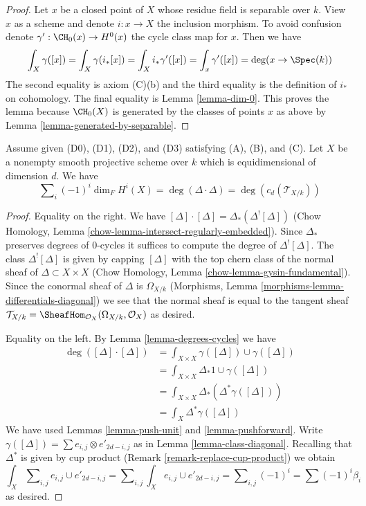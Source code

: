 \begin{proof}
Let $x$ be a closed point of $X$ whose residue field is separable
over $k$. View $x$ as a scheme and denote $i : x \to X$ the inclusion morphism.
To avoid confusion denote $\gamma' : \CH_0(x) \to H^0(x)$ the cycle class map
for $x$. Then we have
$$
\int_X \gamma([x]) = \int_X \gamma(i_*[x]) =
\int_X i_*\gamma'([x]) = \int_x \gamma'([x]) = \deg(x \to \Spec(k))
$$
The second equality is axiom (C)(b) and the third equality is
the definition of $i_*$ on cohomology. The final equality is
Lemma \ref{lemma-dim-0}. This proves the lemma
because $\CH_0(X)$ is generated by the classes of points $x$ as above
by Lemma \ref{lemma-generated-by-separable}.
\end{proof}

\begin{lemma}
\label{lemma-square-diagonal}
Assume given (D0), (D1), (D2), and (D3) satisfying (A), (B), and (C).
Let $X$ be a nonempty smooth projective scheme over $k$ which is
equidimensional of dimension $d$. We have
$$
\sum\nolimits_i (-1)^i\dim_F H^i(X) =
\deg(\Delta \cdot \Delta) = \deg(c_d(\mathcal{T}_{X/k}))
$$
\end{lemma}

\begin{proof}
Equality on the right. We have
$[\Delta] \cdot [\Delta] = \Delta_*(\Delta^![\Delta])$
(Chow Homology, Lemma \ref{chow-lemma-intersect-regularly-embedded}).
Since $\Delta_*$ preserves degrees of $0$-cycles it suffices to compute
the degree of $\Delta^![\Delta]$. The class $\Delta^![\Delta]$ is given
by capping $[\Delta]$ with
the top chern class of the normal sheaf of $\Delta \subset X \times X$
(Chow Homology, Lemma \ref{chow-lemma-gysin-fundamental}).
Since the conormal sheaf of $\Delta$ is $\Omega_{X/k}$
(Morphisms, Lemma \ref{morphisms-lemma-differentials-diagonal})
we see that the normal sheaf is equal to the tangent sheaf
$\mathcal{T}_{X/k} = \SheafHom_{\mathcal{O}_X}(\Omega_{X/k}, \mathcal{O}_X)$
as desired.

\medskip\noindent
Equality on the left. By Lemma \ref{lemma-degrees-cycles} we have
\begin{align*}
\deg([\Delta] \cdot [\Delta])
& =
\int_{X \times X} \gamma([\Delta]) \cup \gamma([\Delta]) \\
& =
\int_{X \times X} \Delta_*1 \cup \gamma([\Delta]) \\
& =
\int_{X \times X} \Delta_*(\Delta^*\gamma([\Delta])) \\
& =
\int_X \Delta^*\gamma([\Delta])
\end{align*}
We have used Lemmas \ref{lemma-push-unit} and
\ref{lemma-pushforward}.
Write $\gamma([\Delta]) = \sum  e_{i, j} \otimes e'_{2d - i , j}$
as in Lemma \ref{lemma-class-diagonal}.
Recalling that $\Delta^*$ is given by cup product
(Remark \ref{remark-replace-cup-product}) we obtain
$$
\int_X \sum\nolimits_{i, j} e_{i, j} \cup e'_{2d - i, j} =
\sum\nolimits_{i, j} \int_X e_{i, j} \cup e'_{2d - i, j} =
\sum\nolimits_{i, j} (-1)^i = \sum (-1)^i\beta_i
$$
as desired.
\end{proof}

